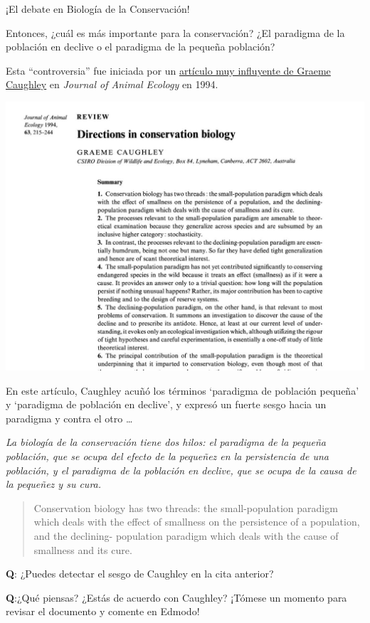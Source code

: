 \documentclass[
]{article}
\begin{document}
¡El debate en Biología de la Conservación!

Entonces, ¿cuál es más importante para la conservación? ¿El paradigma de
la población en declive o el paradigma de la pequeña población?

Esta ``controversia'' fue iniciada por un \href{caughley1.pdf}{artículo
muy influyente de Graeme Caughley} en \emph{Journal of Animal Ecology }
en 1994.

\includegraphics{figures/caughley1.jpg}

En este artículo, Caughley acuñó los términos `paradigma de población
pequeña' y `paradigma de población en declive', y expresó un fuerte
sesgo hacia un paradigma y contra el otro \ldots{}

\emph{La biología de la conservación tiene dos hilos: el paradigma de la
pequeña población, que se ocupa del efecto de la pequeñez en la
persistencia de una población, y el paradigma de la población en
declive, que se ocupa de la causa de la pequeñez y su cura.}

\begin{quote}
Conservation biology has two threads: the small-population paradigm
which deals with the effect of smallness on the persistence of a
population, and the declining- population paradigm which deals with the
cause of smallness and its cure.
\end{quote}

\textbf{Q}: ¿Puedes detectar el sesgo de Caughley en la cita anterior?

\textbf{Q}:¿Qué piensas? ¿Estás de acuerdo con Caughley? ¡Tómese un
momento para revisar el documento y comente en Edmodo!
\end{document}
